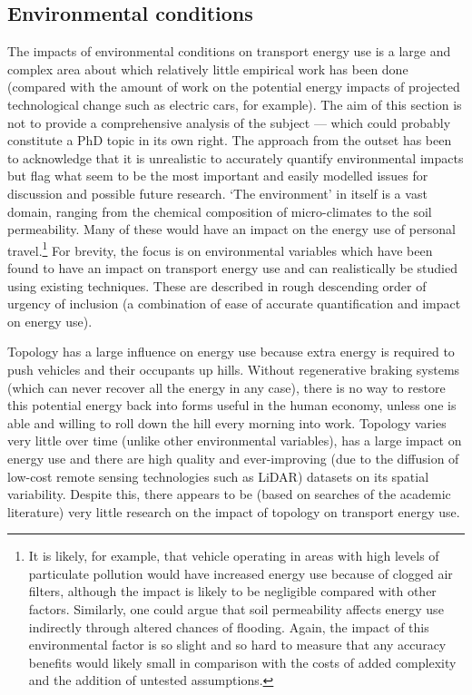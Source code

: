 \documentclass[a4paper, 11pt, twoside]{Thesis}
\begin{document}
\subsection{Environmental conditions} 
The impacts of environmental conditions on transport energy use is
a large and complex area about which relatively little empirical work has been
done (compared with the amount of work on the potential energy impacts of
projected technological change such as electric cars, for example).
The aim of this section is not to provide a comprehensive analysis of the
subject --- which could probably constitute a PhD
topic in its own right. The approach from the outset has been to acknowledge that
it is unrealistic to accurately quantify environmental impacts but flag what seem
to be the most important and easily modelled issues for discussion and
possible future research. `The environment' in itself is a vast domain,
ranging from the chemical composition of micro-climates to the soil
permeability. Many of these would have an impact on the energy use of
personal travel.\footnote{It is
likely, for example, that vehicle operating in areas with high levels
of particulate pollution would have increased energy use because
of clogged air filters, although the impact is likely to be negligible
compared with other factors. Similarly, one could argue that soil permeability
affects energy use indirectly through altered chances of flooding.
Again, the impact of this environmental factor is so slight and so hard
to measure that any accuracy benefits would likely small in comparison with
the costs of added complexity and the addition of untested assumptions.
}
For brevity, the focus is on environmental variables
which have been found to have an impact on transport energy use and
can realistically be studied using existing techniques. These are described 
in rough descending order of urgency of inclusion (a combination of ease
of accurate quantification and impact on energy use).


Topology has a large influence on energy use because extra
 energy is required to push vehicles and their occupants up hills. Without
 regenerative braking systems (which can never recover all the energy in
 any case), there is no way to restore this potential energy back into forms
 useful in the human economy, unless
 one is able and willing to roll down the hill every morning into work.
 Topology varies very little over time (unlike other environmental variables),
 has a large impact on energy use and there are high quality and ever-improving
 (due to the diffusion of low-cost remote sensing technologies such as LiDAR)
 datasets on its spatial variability. Despite this, there appears to be
 (based on searches of the academic literature) very little research on the
 impact of topology on transport energy use.
\end{document}
